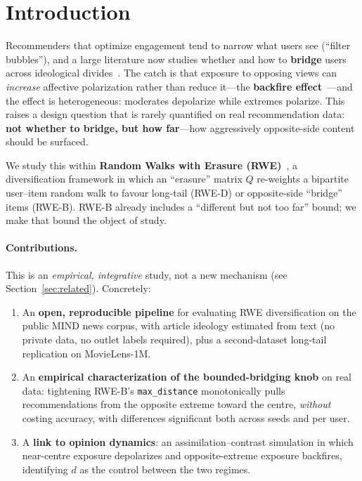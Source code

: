 \documentclass[sigconf,nonacm]{acmart}
\begin{document}

\maketitle

\section{Introduction}
Recommenders that optimize engagement tend to narrow what users see (``filter
bubbles''), and a large literature now studies whether and how to
\textbf{bridge} users across ideological divides~\cite{stray2021designing,
stray2023bridging}. The catch is that exposure to opposing views can
\emph{increase} affective polarization rather than reduce it---the
\textbf{backfire effect}~\cite{bail2018exposure}---and the effect is
heterogeneous: moderates depolarize while extremes polarize. This raises a design
question that is rarely quantified on real recommendation data: \textbf{not
whether to bridge, but how far}---how aggressively opposite-side content should be
surfaced.

We study this within \textbf{Random Walks with Erasure
(RWE)}~\cite{paudel2021rwe}, a diversification framework in which an ``erasure''
matrix $Q$ re-weights a bipartite user--item random walk to favour long-tail
(RWE-D) or opposite-side ``bridge'' items (RWE-B). RWE-B already includes a
``different but not too far'' bound; we make that bound the object of study.

\paragraph{Contributions.} This is an \emph{empirical, integrative} study, not a
new mechanism (see Section~\ref{sec:related}). Concretely:
\begin{enumerate}
  \item An \textbf{open, reproducible pipeline} for evaluating RWE
  diversification on the public MIND news corpus, with article ideology estimated
  from text (no private data, no outlet labels required), plus a second-dataset
  long-tail replication on MovieLens-1M.
  \item An \textbf{empirical characterization of the bounded-bridging knob} on
  real data: tightening RWE-B's \texttt{max\_distance} monotonically pulls
  recommendations from the opposite extreme toward the centre, \emph{without}
  costing accuracy, with differences significant both across seeds and per user.
  \item A \textbf{link to opinion dynamics}: an assimilation--contrast simulation
  in which near-centre exposure depolarizes and opposite-extreme exposure
  backfires, identifying $d$ as the control between the two regimes.
\end{enumerate}
\end{document}
